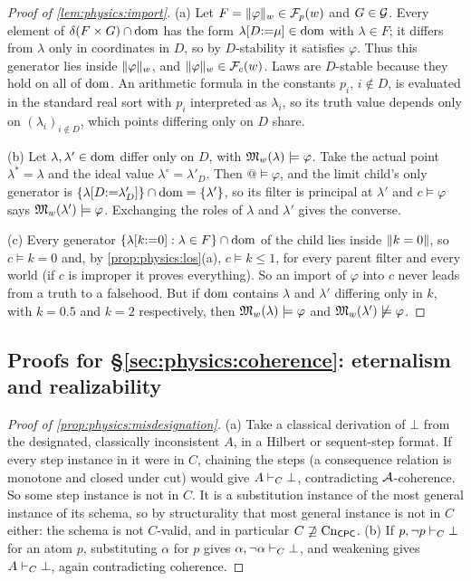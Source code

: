\begin{proof}[Proof of \cref{lem:physics:import}]
(a) Let $F=\lVert \varphi\rVert_w\in\mathcal{F}_p(w)$ and $G\in\mathcal{G}$. Every element of
$\delta(F\times G)\cap\operatorname{dom}$ has the form $\lambda[D{:=}\mu]\in\operatorname{dom}$ with $\lambda\in F$; it
differs from $\lambda$ only in coordinates in $D$, so by $D$-stability it satisfies
$\varphi$. Thus this generator lies inside $\lVert \varphi\rVert_w$, and
$\lVert \varphi\rVert_w\in\mathcal{F}_c(w)$. Laws are $D$-stable because they hold on all of $\operatorname{dom}$.
An arithmetic formula in the constants $p_i$, $i\notin D$, is evaluated in the standard
real sort with $p_i$ interpreted as $\lambda_i$, so its truth value depends only on
$(\lambda_i)_{i\notin D}$, which points differing only on $D$ share.

(b) Let $\lambda,\lambda'\in\operatorname{dom}$ differ only on $D$, with $\mathfrak{M}_w(\lambda)\models\varphi$.
Take the actual point $\lambda^*=\lambda$ and the ideal value $\lambda^\circ=\lambda'_D$.
Then $@\models\varphi$, and the limit child's only generator is
$\{\lambda[D{:=}\lambda'_D]\}\cap\operatorname{dom}=\{\lambda'\}$, so its filter is principal at $\lambda'$
and $c\models\varphi$ says $\mathfrak{M}_w(\lambda')\models\varphi$. Exchanging the roles of
$\lambda$ and $\lambda'$ gives the converse.

(c) Every generator $\{\lambda[k{:=}0]:\lambda\in F\}\cap\operatorname{dom}$ of the child lies inside
$\lVert k=0\rVert$, so $c\models k=0$ and, by \cref{prop:physics:los}(a), $c\models k\le1$, for
every parent filter and every world (if $c$ is improper it proves everything). So an
import of $\varphi$ into $c$ never leads from a truth to a falsehood. But if $\operatorname{dom}$ contains
$\lambda$ and $\lambda'$ differing only in $k$, with $k=0.5$ and $k=2$ respectively, then
$\mathfrak{M}_w(\lambda)\models\varphi$ and $\mathfrak{M}_w(\lambda')\not\models\varphi$.
\end{proof}

\subsection{Proofs for \S\ref{sec:physics:coherence}: eternalism and realizability}

\begin{proof}[Proof of \cref{prop:physics:misdesignation}]
(a) Take a classical derivation of $\bot$ from the designated, classically inconsistent
$A$, in a Hilbert or sequent-step format. If every step instance in it were in $C$, chaining
the steps (a consequence relation is monotone and closed under cut) would give
$A\vdash_C\bot$, contradicting $\mathcal{A}$-coherence. So some step instance is not in $C$. It is a
substitution instance of the most general instance of its schema, so by structurality that
most general instance is not in $C$ either: the schema is not $C$-valid, and in particular
$C\not\supseteq\mathrm{Cn}_{\mathsf{CPC}}$. (b) If $p,\neg p\vdash_C\bot$ for an atom $p$, substituting $\alpha$
for $p$ gives $\alpha,\neg\alpha\vdash_C\bot$, and weakening gives $A\vdash_C\bot$, again
contradicting coherence.
\end{proof}

